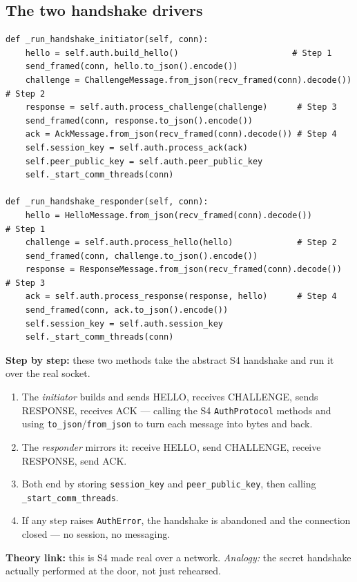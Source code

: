 \documentclass[11pt,a4paper]{article}
\begin{document}
\subsection{The two handshake drivers}
\begin{lstlisting}[style=py,caption={vehicle\_node.py --- driving the 4-step handshake over the socket.}]
def _run_handshake_initiator(self, conn):
    hello = self.auth.build_hello()                       # Step 1
    send_framed(conn, hello.to_json().encode())
    challenge = ChallengeMessage.from_json(recv_framed(conn).decode())  # Step 2
    response = self.auth.process_challenge(challenge)      # Step 3
    send_framed(conn, response.to_json().encode())
    ack = AckMessage.from_json(recv_framed(conn).decode()) # Step 4
    self.session_key = self.auth.process_ack(ack)
    self.peer_public_key = self.auth.peer_public_key
    self._start_comm_threads(conn)

def _run_handshake_responder(self, conn):
    hello = HelloMessage.from_json(recv_framed(conn).decode())          # Step 1
    challenge = self.auth.process_hello(hello)             # Step 2
    send_framed(conn, challenge.to_json().encode())
    response = ResponseMessage.from_json(recv_framed(conn).decode())    # Step 3
    ack = self.auth.process_response(response, hello)      # Step 4
    send_framed(conn, ack.to_json().encode())
    self.session_key = self.auth.session_key
    self._start_comm_threads(conn)
\end{lstlisting}
\textbf{Step by step:} these two methods take the abstract S4 handshake and run
it over the real socket.
\begin{enumerate}
  \item The \emph{initiator} builds and sends HELLO, receives CHALLENGE, sends
        RESPONSE, receives ACK --- calling the S4 \texttt{AuthProtocol} methods
        and using \texttt{to\_json}/\texttt{from\_json} to turn each message into
        bytes and back.
  \item The \emph{responder} mirrors it: receive HELLO, send CHALLENGE, receive
        RESPONSE, send ACK.
  \item Both end by storing \texttt{session\_key} and \texttt{peer\_public\_key},
        then calling \texttt{\_start\_comm\_threads}.
  \item If any step raises \texttt{AuthError}, the handshake is abandoned and the
        connection closed --- no session, no messaging.
\end{enumerate}
\textbf{Theory link:} this is S4 made real over a network. \emph{Analogy:} the
secret handshake actually performed at the door, not just rehearsed.
\end{document}
